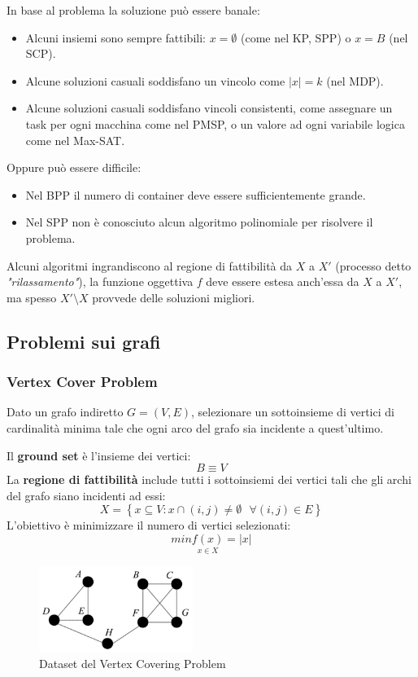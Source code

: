 \documentclass{article}
\begin{document}
In base al problema la soluzione può essere banale:
\begin{itemize}
    \item Alcuni insiemi sono sempre fattibili: $x=\emptyset$ (come nel KP, SPP) o $x=B$ (nel SCP).
    \item Alcune soluzioni casuali soddisfano un vincolo come $|x|=k$ (nel MDP).
    \item Alcune soluzioni casuali soddisfano vincoli consistenti, come assegnare un task per ogni macchina
          come nel PMSP, o un valore ad ogni variabile logica come nel Max-SAT.
\end{itemize}
Oppure può essere difficile:
\begin{itemize}
    \item Nel BPP il numero di container deve essere sufficientemente grande.
    \item Nel SPP non è conosciuto alcun algoritmo polinomiale per risolvere il problema.
\end{itemize}

Alcuni algoritmi ingrandiscono al regione di fattibilità da $X$ a $X'$ (processo detto \textit{"rilassamento"}),
la funzione oggettiva $f$ deve essere estesa anch'essa da $X$ a $X'$, ma spesso $X'\setminus X$ provvede delle
soluzioni migliori.

\subsection{Problemi sui grafi}
\subsubsection{Vertex Cover Problem}
Dato un grafo indiretto $G=(V,E)$, selezionare un sottoinsieme di vertici di cardinalità minima tale che ogni
arco del grafo sia incidente a quest'ultimo.

Il \textbf{ground set} è l'insieme dei vertici:
$$B\equiv V$$
La \textbf{regione di fattibilità} include tutti i sottoinsiemi dei vertici tali che gli archi del grafo siano
incidenti ad essi:
$$X=\left\{x\subseteq V:x\cap (i,j)\neq\emptyset \text{ }\forall (i,j)\in E\right\}$$
L'obiettivo è minimizzare il numero di vertici selezionati:
$$min\underset{x\in X}{f(x)}=|x|$$

\begin{figure}[H]
    \centering
    \includegraphics[width=5cm]{images/VCP_dataset.png}
    \caption{Dataset del Vertex Covering Problem}
    \label{fig:dataset_VCP}
\end{figure}
\end{document}
